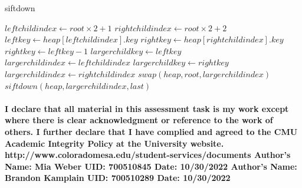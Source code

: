 \documentclass{article}
\begin{document}
\begin{algorithm}[H]
\caption{siftdown}\label{alg:cap}
\begin{algorithmic}
\State $leftchildindex \gets root \times 2+1$
\State $rightchildindex \gets root \times 2+2$
\State $leftkey \gets heap[leftchildindex].key$
\State $rightkey \gets heap[rightchildindex].key$
\Else
\State $rightkey \gets leftkey-1$
\EndIf
{}
\State $largerchildkey \gets leftkey$
\State $largerchildindex \gets leftchildindex$
\Else
\State $largerchildkey \gets rightkey$
\State $largerchildindex \gets rightchildindex$
\EndIf
{}
\State $swap(heap, root, largerchildindex)$
\State $siftdown(heap, largerchildindex, last)$
\EndIf
\EndIf
\end{algorithmic}
\end{algorithm}

\paragraph{\linebreak I declare that all material in this assessment task is my work except where there is clear acknowledgment or reference to the work of others. I further declare that I have complied and agreed to the CMU Academic Integrity Policy at the University website.
\linebreak  http://www.coloradomesa.edu/student-services/documents
\linebreak \linebreak Author’s Name: Mia Weber UID: 700510845 Date: 10/30/2022
\linebreak Author's Name: Brandon Kamplain UID: 700510289 Date: 10/30/2022}
\end{document}
